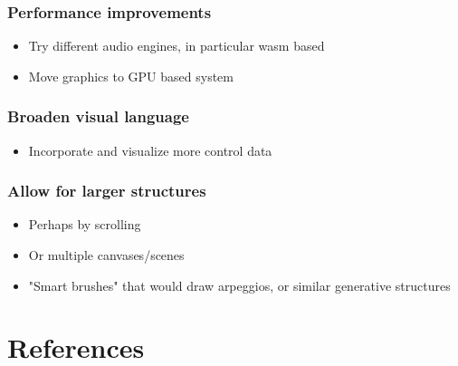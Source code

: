 \documentclass[a4paper,12pt]{article}
\begin{document}
\subsubsection{Performance improvements}
\label{sec:orgf04e15a}
\begin{itemize}
\item Try different audio engines, in particular wasm based
\item Move graphics to GPU based system
\end{itemize}
\subsubsection{Broaden visual language}
\label{sec:org6673bbe}
\begin{itemize}
\item Incorporate and visualize more control data
\end{itemize}
\subsubsection{Allow for larger structures}
\label{sec:org0b70dad}
\begin{itemize}
\item Perhaps by scrolling
\item Or multiple canvases/scenes
\item "Smart brushes" that would draw arpeggios, or similar generative structures
\end{itemize}

\section{References}
\label{sec:org19dcd36}
\end{document}
